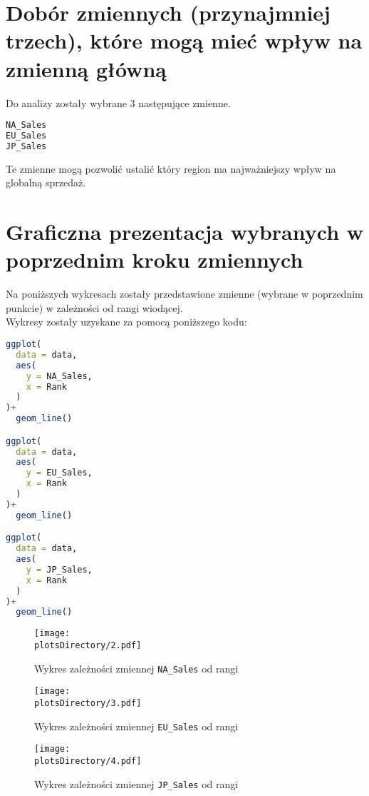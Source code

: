 	\section{Dobór zmiennych (przynajmniej trzech), które mogą mieć wpływ na zmienną główną}
	Do analizy zostały wybrane 3 następujące zmienne.
	\begin{lstlisting}[language=R]
NA_Sales
EU_Sales
JP_Sales
\end{lstlisting}
Te zmienne mogą pozwolić ustalić który region ma najważniejszy wpływ na globalną sprzedaż.
	\section{Graficzna prezentacja wybranych w poprzednim kroku zmiennych}
	Na poniższych wykresach zostały przedstawione zmienne (wybrane w poprzednim punkcie) w zależności od rangi wiodącej.\\
	Wykresy zostały uzyskane za pomocą poniższego kodu:
	\begin{lstlisting}[language=R]
ggplot(
  data = data,
  aes(
    y = NA_Sales,
    x = Rank 
  )
)+
  geom_line()

ggplot(
  data = data,
  aes(
    y = EU_Sales,
    x = Rank 
  )
)+
  geom_line()

ggplot(
  data = data,
  aes(
    y = JP_Sales,
    x = Rank 
  )
)+
  geom_line()
\end{lstlisting}
	\begin{center}
	\begin{figure}[H]
  	\texttt{[image: \\plotsDirectory/2.pdf]}
  	\caption{Wykres zależności zmiennej \texttt{NA\_Sales} od rangi}
	\end{figure}	
	\begin{figure}[H]
  	\texttt{[image: \\plotsDirectory/3.pdf]}
  	\caption{Wykres zależności zmiennej \texttt{EU\_Sales} od rangi}
	\end{figure}	
	\begin{figure}[H]
  	\texttt{[image: \\plotsDirectory/4.pdf]}
  	\caption{Wykres zależności zmiennej \texttt{JP\_Sales} od rangi}
	\end{figure}	
	\end{center}
	

